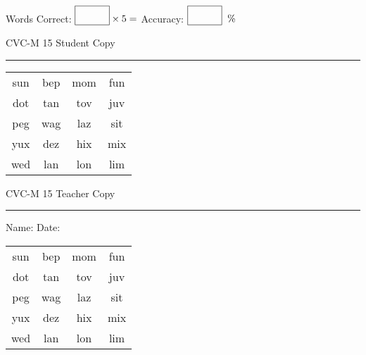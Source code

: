 \documentclass{memoir}
\begin{document}
\small

Words Correct: $\fbox{\phantom{\huge 100}} \times 5 = $ Accuracy: $\fbox{\phantom{\huge 100}}\;\; \%$ 

\vfill

\newpage


\footnotesize \noindent
CVC-M 15 \hfill Student Copy
\smallskip
\hrule

\Large

\setlength{\tabcolsep}{14pt}
\def\arraystretch{2}

{\selectfont


\begin{vplace}[0.5]
\begin{center}
\begin{tabular}{cccc}
sun & bep & mom & fun \\
dot & tan & tov & juv \\
peg & wag & laz & sit \\
yux & dez & hix & mix \\
wed & lan & lon & lim \\
\end{tabular}
\end{center}
\end{vplace}

}

\newpage

\footnotesize \noindent
CVC-M 15 \hfill Teacher Copy
\smallskip
\hrule

\small

\vfill

\noindent
Name: \underline{\hspace{1.75in}} \hfill Date: \underline{\hspace{1in}}

\Large

{\selectfont


\begin{vplace}[0.5]
\begin{center}
\begin{tabular}{cccc}
sun & bep & mom & fun \\
dot & tan & tov & juv \\
peg & wag & laz & sit \\
yux & dez & hix & mix \\
wed & lan & lon & lim \\
\end{tabular}
\end{center}
\end{vplace}



}
\end{document}
